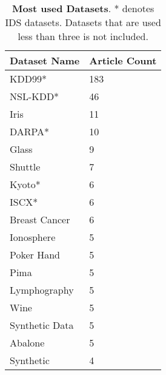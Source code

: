 
\begin{table}[!ht]
    \centering 
    \caption{ \textbf{Most used Datasets}. * denotes IDS datasets. Datasets that are used less than three is not included.}
    \label{table-metaDatasetsUsed}


\begin{tabular}{ll}

\toprule

\textbf{Dataset Name  }     & \textbf{Article Count} \\

\midrule

\rowcolor{Gray}
KDD99*  & 183 \\ 
\rowcolor{Gray}
NSL-KDD*  & 46 \\ 
Iris & 11 \\ 
\rowcolor{Gray}
DARPA*  & 10 \\ 
Glass & 9 \\ 
Shuttle & 7 \\ 
\rowcolor{Gray}
Kyoto*  & 6 \\ 
\rowcolor{Gray}
ISCX*  & 6 \\ 
Breast Cancer & 6 \\ 
Ionosphere & 5 \\ 
Poker Hand & 5 \\ 
Pima & 5 \\ 
Lymphography & 5 \\ 
Wine & 5 \\ 
Synthetic Data & 5 \\ 
Abalone & 5 \\ 
Synthetic & 4 \\ 

\bottomrule

\end{tabular}

\end{table}

